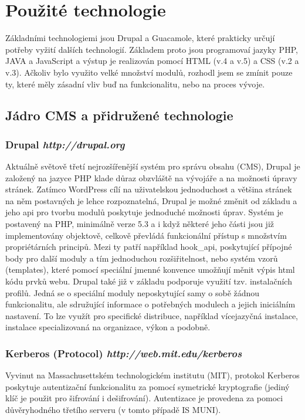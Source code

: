 \section{Použité technologie}
\label{sec:technologies}

Základními technologiemi jsou Drupal a Guacamole, které prakticky určují potřeby vyžití dalších technologií. Základem proto jsou programovaí jazyky PHP, JAVA a JavaScript a výstup je realizován pomocí HTML (v.4 a v.5) a CSS (v.2 a v.3). Ačkoliv bylo využito velké množství modulů, rozhodl jsem se zmínit pouze ty, které měly zásadní vliv buď na funkcionalitu, nebo na proces vývoje.

\subsection{Jádro CMS a přidružené technologie}

\subsubsection*{Drupal \hfill \emph{http://drupal.org}} 
\label{subsec:drupal}
Aktuálně světově třetí nejrozšířenější\cite{website:cms-market-share} systém pro správu obsahu (CMS), Drupal je založený na jazyce PHP klade důraz obzvláště na vývojáře a na možnosti úpravy stránek. Zatímco WordPress cílí na uživatelskou jednoduchost a většina stránek na něm postavných je lehce rozpoznatelná, Drupal je možné změnit od základu a jeho \gls{api} pro tvorbu modulů poskytuje jednoduché možnosti úprav. Systém je postavený na PHP, minimálně verze 5.3 a i když některé jeho části jsou již implementovány objektově, celkově převládá funkcionální přístup s množstvím propriétárních principů. Mezi ty patří například hook\_api, poskytující přípojné body pro další moduly a tím jednoduchou rozšiřitelnost, nebo systém vzorů (templates), které pomocí speciální jmenné konvence umožňují měnit výpis html kódu prvků webu.
Drupal také již v základu podporuje využití tzv. instalačních profilů. Jedná se o speciální moduly neposkytující samy o sobě žádnou funkcionalitu, ale sdružující informace o potřebných modulech a jejich iniciálním nastavení. To lze využít pro specifické distribuce, například vícejazyčná instalace, instalace specializovaná na organizace, výkon a podobně.

\subsubsection*{Kerberos (Protocol) \hfill \emph{http://web.mit.edu/kerberos}}
Vyvinut na Massachusettském technologickém institutu (MIT), protokol Kerberos poskytuje autentizační funkcionalitu za pomocí symetrické kryptografie (jediný klíč je použit pro šifrování i dešifrování). Autentizace je provedena za pomoci důvěryhodného třetího serveru (v tomto případě IS MUNI).

